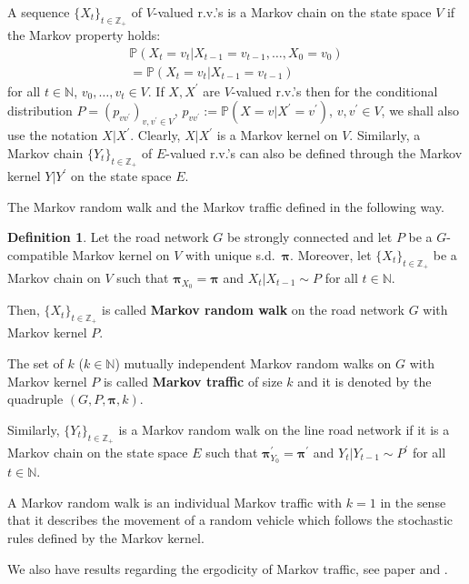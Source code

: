 \documentclass[b5paper,12pt]{report}
\theoremstyle{definition}
\newtheorem{definition}{Definition}
\newcommand{\bpi}{\boldsymbol{\pi}}
\newcommand{\PP}{\mathbb{P}}
\begin{document}
A sequence $\{X_t\}_{t\in\mathbb{Z}_+}$ of $V$-valued r.v.'s is a Markov chain on the state space $V$ if the Markov property holds:
\begin{equation*}
\begin{aligned}
         \PP(X_t=v_t | X_{t-1}=v_{t-1},\ldots, X_0=v_0) \\ =  \PP(X_t=v_t | X_{t-1}=v_{t-1})
\end{aligned}
\end{equation*} 
for all $t\in\mathbb{N}$, $v_0,\ldots,v_t\in V$. If $X,X^\prime$ are $V$-valued r.v.'s then for the conditional distribution $P=(p_{v v^\prime})_{v,v^\prime\in V}$, $p_{v v^\prime}:=\PP(X=v | X^\prime=v^\prime)$, $v,v^\prime\in V$, we shall also use the notation $X|X^\prime$. Clearly, $X|X^\prime$ is a Markov kernel on $V$. Similarly, a Markov chain $\{Y_t\}_{t\in\mathbb{Z}_+}$ of $E$-valued r.v.'s can also be defined through the Markov kernel $Y|Y^\prime$ on the state space $E$.

The Markov random walk and the Markov traffic defined in the following way.

\begin{definition}
Let the road network $G$ be strongly connected and let $P$ be a $G$-compatible Markov kernel on $V$ with unique s.d.~$\bpi$. Moreover, let $\{X_t\}_{t\in\mathbb{Z}_+}$ be a Markov chain on $V$ such that $\bpi_{X_0}=\bpi$ and $X_t|X_{t-1} \sim P$ for all $t\in\mathbb{N}$. 

Then, $\{X_t\}_{t\in\mathbb{Z}_+}$ is called \textbf{Markov random walk} on the road network $G$ with Markov kernel $P$.

The set of $k$ ($k\in\mathbb{N}$) mutually independent Markov random walks on $G$ with Markov kernel $P$ is called \textbf{Markov traffic} of size $k$ and it is denoted by the quadruple $(G,P,\bpi,k)$.
\end{definition}

Similarly, $\{Y_t\}_{t\in\mathbb{Z}_+}$ is a Markov random walk on the line road network if it is a Markov chain on the state space $E$ such that $\bpi^\prime_{Y_0}= \bpi^\prime$ and $Y_t|Y_{t-1}\sim P^\prime$  for all $t\in\mathbb{N}$.

A Markov random walk is an individual Markov traffic with $k=1$ in the sense that it describes the movement of a random vehicle which follows the stochastic rules defined by the Markov kernel. 

We also have results regarding the ergodicity of Markov traffic, see paper \cite{traffic-paper} and \cite{markov-traffic-paper}.
\end{document}
